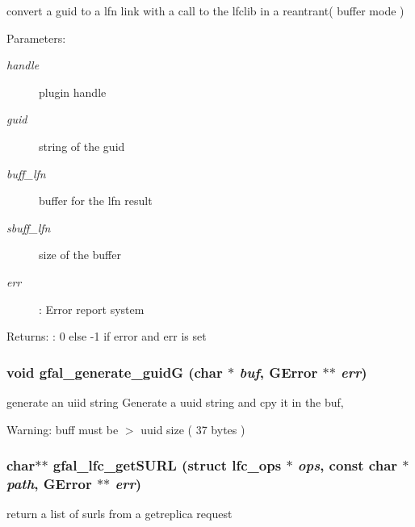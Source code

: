 convert a guid to a lfn link with a call to the lfclib in a reantrant( buffer mode ) \begin{Desc}
\item[Parameters:]
\begin{description}
\item[{\em handle}]plugin handle \item[{\em guid}]string of the guid \item[{\em buff\_\-lfn}]buffer for the lfn result \item[{\em sbuff\_\-lfn}]size of the buffer \item[{\em err}]: Error report system \end{description}
\end{Desc}
\begin{Desc}
\item[Returns:]: 0 else -1 if error and err is set \end{Desc}
\subsubsection{\setlength{\rightskip}{0pt plus 5cm}void gfal\_\-generate\_\-guid\-G (char $\ast$ {\em buf}, GError $\ast$$\ast$ {\em err})}\label{lfc__ifce__ng_8h_4cb5e50a1af5612463aaa525162a2e9e}


generate an uiid string Generate a uuid string and cpy it in the buf, 

\begin{Desc}
\item[Warning:]buff must be $>$ uuid size ( 37 bytes ) \end{Desc}
\subsubsection{\setlength{\rightskip}{0pt plus 5cm}char$\ast$$\ast$ gfal\_\-lfc\_\-get\-SURL (struct lfc\_\-ops $\ast$ {\em ops}, const char $\ast$ {\em path}, GError $\ast$$\ast$ {\em err})}\label{lfc__ifce__ng_8h_26c355c9cf576886a743ab1917de295d}


return a list of surls from a getreplica request 
